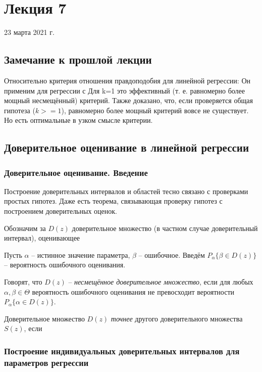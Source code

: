 \documentclass[main.tex]{subfiles}
\begin{document}
\section{Лекция 7}
23 марта 2021 г.

\subsection{Замечание к прошлой лекции}

Относительно критерия отношения правдоподобия для линейной регрессии:
Он применим для регрессии с
Для  k=1 это эффективный (т. е. равномерно более мощный несмещённый) критерий.
Также доказано, что, если проверяется общая гипотеза ($ k >= 1 $), равномерно более мощный критерий вовсе не существует.
Но есть оптимальные в узком смысле критерии.

\subsection{Доверительное оценивание в линейной регрессии}

\subsubsection{Доверительное оценивание. Введение}

Построение доверительных интервалов и областей тесно связано с проверками простых гипотез.
Даже есть теорема, связывающая проверку гипотез с построением доверительных оценок.

Обозначим за $ D(z) $ доверительное множество (в частном случае доверительный интервал), оценивающее

Пусть $ \alpha $ -- истинное значение параметра, $ \beta $ -- ошибочное.
Введём $ P_\alpha \{ \beta \in D(z) \} $ -- вероятность ошибочного оценивания.

Говорят, что $ D(z) $ -- \emph{несмещённое доверительное множество}, если для любых $ \alpha, \beta \in \Theta $ вероятность ошибочного оценивания не превосходит вероятности $ P_\alpha \{ \alpha \in D(z) \} $.

Доверительное множество $ D(z) $ \emph{точнее} другого доверительного множества $ S(z) $, если

\subsubsection{Построение индивидуальных доверительных интервалов для параметров регрессии}
\end{document}
